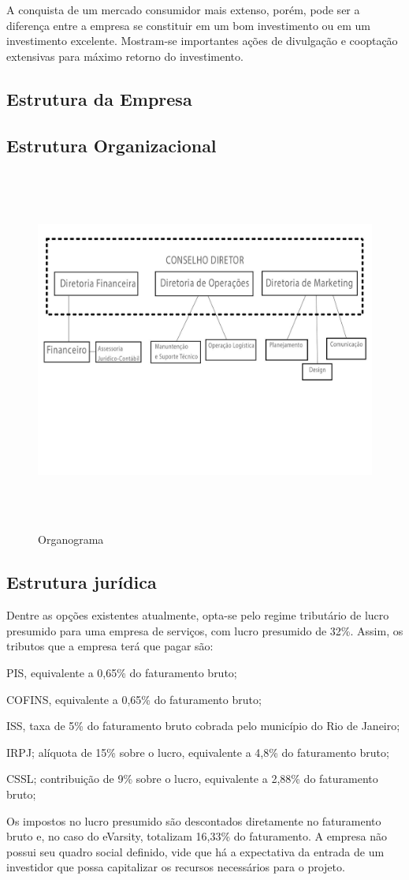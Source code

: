 \documentclass[a4paper, 12pt]{paper}
\begin{document}
A conquista de um mercado consumidor mais extenso, porém, pode ser a diferença entre a empresa se constituir em um bom investimento ou em um investimento excelente. Mostram-se importantes ações de divulgação e cooptação extensivas para máximo retorno do investimento.
\newpage
\begin{landscape}
\section{Estrutura da Empresa}
\subsection{Estrutura Organizacional}
    \begin{figure}[!ht]
    	\centering
    	\includegraphics[width=25cm,height=12cm]{img/img09.jpg}
    	\caption{Organograma}
    \end{figure}
\end{landscape}    
\subsection{Estrutura jurídica}
Dentre as opções existentes atualmente, opta-se pelo regime tributário de lucro presumido para uma empresa de serviços, com lucro presumido de 32\%. Assim, os tributos que a empresa terá que pagar são:

PIS, equivalente a 0,65\% do faturamento bruto;

COFINS, equivalente a 0,65\% do faturamento bruto;

ISS, taxa de 5\% do faturamento bruto cobrada pelo município do Rio de Janeiro;

IRPJ; alíquota de 15\% sobre o lucro, equivalente a 4,8\% do faturamento bruto;

CSSL; contribuição de 9\% sobre o lucro, equivalente a 2,88\% do faturamento bruto;

Os impostos no lucro presumido são descontados diretamente no faturamento bruto e, no caso do eVarsity, totalizam 16,33\% do faturamento. A empresa não possui seu quadro social definido, vide que há a expectativa da entrada de um investidor que possa capitalizar os recursos necessários para o projeto.
\end{document}
